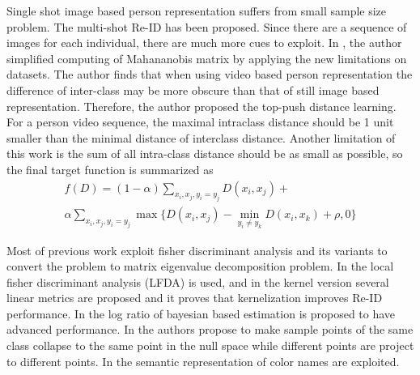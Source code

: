 Single shot image based person representation suffers from small sample size problem. The multi-shot Re-ID has been proposed. Since there are a sequence of images for each individual, there are much more cues to exploit.
In \cite{TDL}, the author simplified computing of Mahananobis matrix by applying the new limitations on datasets. The author finds that when using video based person representation the difference of inter-class may be more obscure than that of still image based representation. Therefore, the author proposed the top-push distance learning. For a person video sequence, the maximal intraclass distance should be 1 unit smaller than the minimal distance of interclass distance. Another limitation of this work is the sum of all intra-class distance should be as small as possible, so the final target function is summarized as 
\begin{equation}
\begin{aligned}
f(D) = (1-\alpha)\sum_{x_i,x_j,y_i=y_j} D(x_i,x_j) + \\
\alpha \sum_{x_i,x_j,y_i=y_j}\max\{{D(x_i,x_j)-\min_{y_i\ne y_k}{D(x_i,x_k)}+\rho,0}\}
\end{aligned}
\end{equation}

Most of previous work exploit fisher discriminant analysis and its variants to convert the problem to matrix eigenvalue decomposition problem. In \cite{LFDA} the local fisher discriminant analysis (LFDA) is used, and in \cite{KernelVersionMetrics} the kernel version several linear metrics are proposed and it proves that kernelization improves Re-ID performance. In \cite{LOMO} the log ratio of bayesian based estimation is proposed to have advanced performance. In \cite{NFST} the authors propose to make sample points of the same class collapse to the same point in the null space while different points are project to different points. In \cite{SCNCD} the semantic representation of color names are exploited. 

